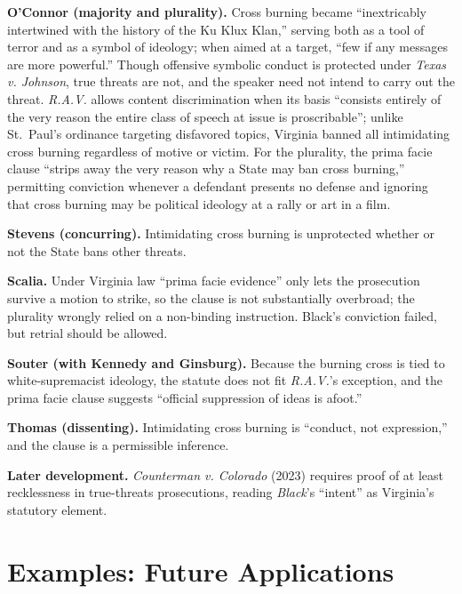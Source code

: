 \documentclass[12pt]{article}
\begin{document}
\textbf{O'Connor (majority and plurality).} Cross burning became ``inextricably intertwined with the history of the Ku Klux Klan,'' serving both as a tool of terror and as a symbol of ideology; when aimed at a target, ``few if any messages are more powerful.'' Though offensive symbolic conduct is protected under \textit{Texas v. Johnson}, true threats are not, and the speaker need not intend to carry out the threat. \textit{R.A.V.} allows content discrimination when its basis ``consists entirely of the very reason the entire class of speech at issue is proscribable''; unlike St.~Paul's ordinance targeting disfavored topics, Virginia banned all intimidating cross burning regardless of motive or victim. For the plurality, the prima facie clause ``strips away the very reason why a State may ban cross burning,'' permitting conviction whenever a defendant presents no defense and ignoring that cross burning may be political ideology at a rally or art in a film.

\textbf{Stevens (concurring).} Intimidating cross burning is unprotected whether or not the State bans other threats.

\textbf{Scalia.} Under Virginia law ``prima facie evidence'' only lets the prosecution survive a motion to strike, so the clause is not substantially overbroad; the plurality wrongly relied on a non-binding instruction. Black's conviction failed, but retrial should be allowed.

\textbf{Souter (with Kennedy and Ginsburg).} Because the burning cross is tied to white-supremacist ideology, the statute does not fit \textit{R.A.V.}'s exception, and the prima facie clause suggests ``official suppression of ideas is afoot.''

\textbf{Thomas (dissenting).} Intimidating cross burning is ``conduct, not expression,'' and the clause is a permissible inference.

\textbf{Later development.} \textit{Counterman v. Colorado} (2023) requires proof of at least recklessness in true-threats prosecutions, reading \textit{Black}'s ``intent'' as Virginia's statutory element.

\section{Examples: Future Applications}
\end{document}
